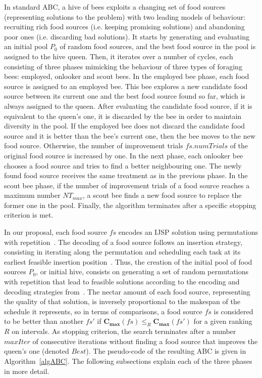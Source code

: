 \documentclass[icae]{iosart2x}
\newcommand{\reviewed}[1]{#1} %
\begin{document}
\reviewed{
In standard ABC, a hive of bees exploits a changing set of food sources (representing solutions to the problem) with two leading models of behaviour: recruiting rich food sources (i.e. keeping promising solutions) and abandoning poor ones (i.e. discarding bad solutions). It starts by generating and evaluating an initial pool $P_0$ of random food sources, and the best food source in the pool is assigned to the hive queen. Then, it iterates over a number of cycles, each consisting of three phases mimicking the behaviour of three types of foraging bees: employed, onlooker and scout bees. In the employed bee phase, each food source is assigned to an employed bee. This bee explores a new candidate food source between its current one and the best food source found so far, which is always assigned to the queen. After evaluating the candidate food source, if it is equivalent to the queen's one, it is discarded by the bee in order to maintain diversity in the pool. If the employed bee does not discard the candidate food source and it is better than the bee's current one, then the bee moves to the new food source. Otherwise, the number of improvement trials $\mathit{fs.numTrials}$ of the original food source is increased by one. In the next phase, each onlooker bee chooses a food source and tries to find a better neighbouring one. The newly found food source receives the same treatment as in the previous phase. In the scout bee phase, if the number of improvement trials of a food source reaches a maximum number $NT_{max}$, a scout bee finds a new food source to replace the former one in the pool. Finally, the algorithm terminates after a specific stopping criterion is met.}

\reviewed{In our proposal, each food source $\mathit{fs}$ encodes an IJSP solution using permutations with repetition~\cite{Bierwirth1995}. The decoding of a food source follows an insertion strategy, consisting in iterating along the permutation and scheduling each task at its earliest feasible insertion position~\cite{Diaz2020genetic}. Thus, the creation of the initial pool of food sources $P_0$, or initial hive, consists on generating a set of random permutations with repetition that lead to feasible solutions according to the encoding and decoding strategies from~\cite{Diaz2020genetic}. The nectar amount of each food source, representing the quality of that solution,  is inversely proportional to the makespan of the schedule it represents, so in terms of comparisons, a food source $fs$ is considered to be better than another $fs'$ if $\mathbf{C_{max}}(fs) \leq_R \mathbf{C_{max}}(fs')$ for a given ranking $R$ on intervals. As stopping criterion, the search terminates after a number $\mathit{maxIter}$ of consecutive iterations without finding a food source that improves the queen's one (denoted $Best$). The pseudo-code of the resulting ABC is given in Algorithm~\ref{algABC}. The following subsections explain each of the three phases in more detail.}
\end{document}
